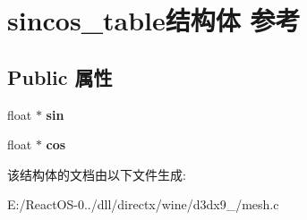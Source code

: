 \hypertarget{structsincos__table}{}\section{sincos\+\_\+table结构体 参考}
\label{structsincos__table}
\subsection*{Public 属性}
\begin{DoxyCompactItemize}
\item 
\mbox{\label{structsincos__table_aa53657966781448ad4a047127edb2f02}} 
float $\ast$ {\bfseries sin}
\item 
\mbox{\label{structsincos__table_a12a36d74607a69da6447603a32b480ec}} 
float $\ast$ {\bfseries cos}
\end{DoxyCompactItemize}


该结构体的文档由以下文件生成\+:\begin{DoxyCompactItemize}
\item 
E\+:/\+React\+O\+S-\/0../dll/directx/wine/d3dx9\+\_/mesh.\+c\end{DoxyCompactItemize}
